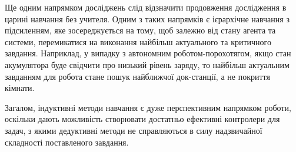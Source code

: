 Ще одним напрямком досліджень слід відзначити продовження дослідження в царині навчання без учителя. Одним з таких напрямків є ієрархічне навчання з підсиленням, яке зосереджується на тому, щоб залежно від стану агента та системи, перемикатися на виконання найбільш актуального та критичного завдання. Наприклад, у випадку з автономним роботом-порохотягом, якщо стан акумулятора буде свідчити про низький рівень заряду, то найбільш актуальним завданням для робота стане пошук найближчої док-станції, а не покриття кімнати.

Загалом, індуктивні методи навчання є дуже перспективним напрямком роботи, оскільки дають можливість створювати достатньо ефективні контролери для задач, з якими дедуктивні методи не справляються в силу надзвичайної складності поставленого завдання.